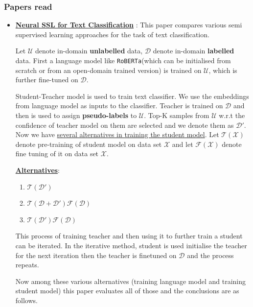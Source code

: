 \documentclass[12pt, a4paper, twoside]{article}
\begin{document}
\subsubsection{Papers read}
\begin{itemize}
    \item \underline{\textbf{Neural SSL for Text Classification}}\cite{sun2020neural} : This paper compares various semi supervised learning approaches for the task of text classification.
    
    Let $\mathcal{U}$ denote in-domain \textbf{unlabelled} data, $\mathcal{D}$ denote in-domain \textbf{labelled} data. First a language model like \texttt{RoBERTa}(which can be initialised from scratch or from an open-domain trained version) is trained on $\mathcal{U}$, which is further fine-tuned on $\mathcal{D}$. 
    
    Student-Teacher model is used to train text classifier. We use the embeddings from language model as inputs to the classifier. Teacher is trained on $\mathcal{D}$ and then is used to assign \textbf{pseudo-labels} to $\mathcal{U}$. Top-K samples from $\mathcal{U}$ w.r.t the confidence of teacher model on them are selected and we denote them as $\mathcal{D'}$. Now we have \underline{several alternatives in training the student model}. Let $\mathcal{T}(\mathcal{X})$ denote pre-training of student model on data set $\mathcal{X}$ and let $\mathcal{F}(\mathcal{X})$ denote fine tuning of it on data set $\mathcal{X}$. 
    
    \underline{\textbf{Alternatives}}:
    \begin{enumerate}
        \item $\mathcal{T}(\mathcal{D'})$ 
        \item $\mathcal{T}(\mathcal{D} + \mathcal{D'}) \mathcal{F}(\mathcal{D})$
        \item $\mathcal{T}(\mathcal{D'}) \mathcal{F}(\mathcal{D})$
    \end{enumerate}
    
    This process of training teacher and then using it to further train a student can be iterated. In the iterative method, student is used initialise the teacher for the next iteration then the teacher is finetuned on $\mathcal{D}$ and the process repeats.
    
    Now among these various alternatives (training language model and training student model) this paper evaluates all of those and the conclusions are as follows.
    

\end{itemize}
\end{document}
